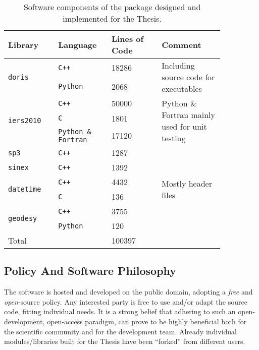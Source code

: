 \begin{table}[h!]
  \centering
  \begin{tabular}{p{0.20\linewidth} | p{0.2\linewidth} | p{0.20\linewidth} | p{0.25\linewidth}}
    \toprule
    \textbf{Library} & \textbf{Language} & \textbf{Lines of Code} & \textbf{Comment}\\
    \midrule
    \multirow{2}{*}{\texttt{doris}}  & \texttt{C++} & 18286 & \multirow{2}{4cm}{Including source code for executables}\\
      & \texttt{Python} & 2068 & \\
    \hline
    \multirow{3}{*}{\texttt{iers2010}}  & \texttt{C++} & 50000 & \multirow{3}{4cm}{Python \& Fortran mainly used for unit testing} \\
      & \texttt{C} & 1801 \\
      & \texttt{Python \& Fortran} &  17120 \\
    \hline
    \texttt{sp3}    & \texttt{C++} & 1287 & \\
    \hline
    \texttt{sinex}  & \texttt{C++} & 1392 & \\
    \hline
    \multirow{2}{*}{\texttt{datetime}}  & \texttt{C++} & 4432 & \multirow{2}{*}{Mostly header files}\\
      & \texttt{C}      & 136 \\
    \hline
    \multirow{2}{*}{\texttt{geodesy}}  & \texttt{C++} & 3755 & \multirow{2}{*}{}\\
      & \texttt{Python} & 120 \\
    \hline
    Total & & 100397\\
    \bottomrule
  \end{tabular}
  \caption{Software components of the package designed and implemented for the Thesis.}
  \label{table:software-components}
\end{table}

\subsection{Policy And Software Philosophy}\label{sec:the-software-policy}
The software is hosted and developed on the public domain, adopting a \emph{free} 
and \emph{open}-source policy. Any interested party is free to use and/or adapt 
the source code, fitting individual needs. It is a strong belief that adhering to 
such an open-development, open-access paradigm, can prove to be highly beneficial 
both for the scientific community and for the development team. Already individual 
modules/libraries built for the Thesis have been ``forked'' from different users.

